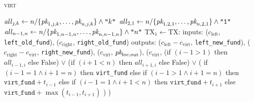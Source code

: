 \begin{center}
\begin{processbox}{\textsc{virt}}
\begin{algorithmic}[1]
          \State $\mathit{all}_{j, k} \gets n/\{\textit{pk}_{1, j, k}, \dots,
          \textit{pk}_{n, j, k}\} \wedge \texttt{"}k\texttt{"}$
        \EndFor
          \State $\mathit{all}_{2, 1} \gets n/\{\textit{pk}_{1, 2, 1}, \dots, \textit{pk}_{n, 2,
          1}\} \wedge \texttt{"1"}$
        \EndIf
          \State $\mathit{all}_{n-1, n} \gets n/\{\textit{pk}_{1, n-1, n}, \dots, \textit{pk}_{n,
          n-1, n}\} \wedge \texttt{"}n\texttt{"}$
        \EndIf
        \State {}
        \State {}
        \State $\mathrm{TX}_1 \gets \mathrm{TX}$:
        \Indent
          \State inputs:
          \Indent
            \State ($c_{\mathrm{left}}$, \texttt{left\_old\_fund}),
            \State ($c_{\mathrm{right}}$, \texttt{right\_old\_fund})
          \EndIndent
          \State outputs:
          \Indent
            \State ($c_{\mathrm{left}} - c_{\mathrm{virt}}$,
            \texttt{left\_new\_fund}),
            \label{code:virtual-layer:mid-txs:initiator:left-new-fund}
            \State ($c_{\mathrm{right}} - c_{\mathrm{virt}}$,
            \texttt{right\_new\_fund}),
            \State ($c_{\mathrm{virt}}$, $\textit{pk}_{\mathrm{loc}, \mathrm{out}}$),
            \State ($c_{\mathrm{virt}}$,
            \Indent
              \State (if $(i-1 > 1)$ then $\mathit{all}_{i-1, i}$ else False)
              \label{code:virtual-layer:mid-txs:initiator:left-all}
              \State $\vee$ (if $(i+1 < n)$ then $\mathit{all}_{i+1, i}$ else
              False)
              \label{code:virtual-layer:mid-txs:initiator:right-all}
              \State $\vee$ (
              \Indent
                \State if $(i-1 = 1 \wedge i+1 = n)$ then \texttt{virt\_fund}
                \label{code:virtual-layer:mid-txs:initiator:i-is-2:n-is-3}
                \State else if $(i-1 > 1 \wedge i+1 = n)$ then
                $\texttt{virt\_fund} + t_{i-1}$
                \State else if $(i-1 = 1 \wedge i+1 < n)$ then
                $\texttt{virt\_fund} + t_{i+1}$
                \State else 
                $\texttt{virt\_fund} + \max{(t_{i-1}, t_{i+1})}$
              \EndIndent
              \State )
            \EndIndent
            \State )
            \label{code:virtual-layer:mid-txs:initiator:virt-out}
          \EndIndent
        \EndIndent


\end{algorithmic}
\end{processbox}
\end{center}
